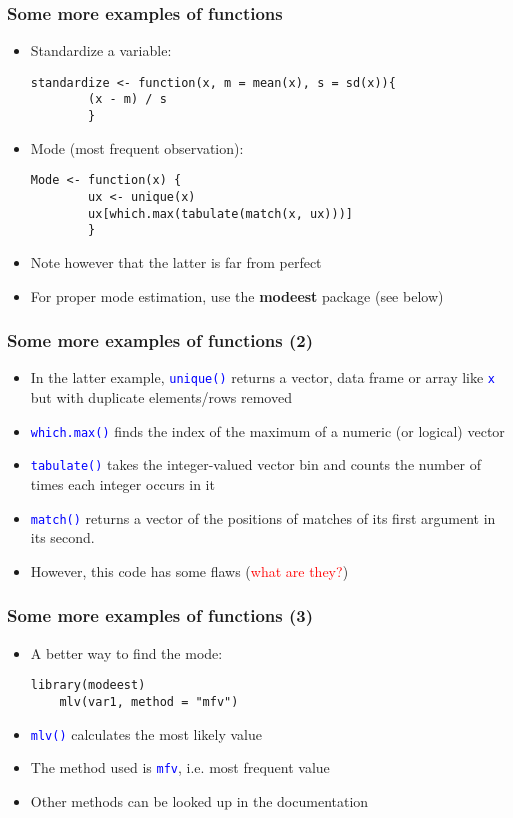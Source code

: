 \documentclass[10pt]{beamer}
\newcommand{\cc}[1]{\texttt{\textcolor{blue}{#1}}}
\theoremstyle{definition}
\begin{document}
\begin{frame}[fragile]
\frametitle{Some more examples of functions}
\begin{itemize}
	\item Standardize a variable:
	\begin{lstlisting}[style = rstyle, breaklines]
	standardize <- function(x, m = mean(x), s = sd(x)){
 		(x - m) / s
		}
	\end{lstlisting}
	\item Mode (most frequent observation):
	\begin{lstlisting}[style = rstyle, breaklines]
	Mode <- function(x) {
		ux <- unique(x)
		ux[which.max(tabulate(match(x, ux)))]
		}
	\end{lstlisting}
	\item Note however that the latter is far from perfect
	\item For proper mode estimation, use the \textbf{modeest} package (see below)
\end{itemize}
\end{frame}

\begin{frame}[fragile]
\frametitle{Some more examples of functions (2)}
\begin{itemize}
	\item In the latter example, \cc{unique()} returns a vector, data frame or array like \cc{x} but with duplicate elements/rows removed
	\item \cc{which.max()} finds the index of the maximum of a numeric (or logical) vector
	\item \cc{tabulate()} takes the integer-valued vector bin and counts the number of times each integer occurs in it
	\item \cc{match()} returns a vector of the positions of matches of its first argument in its second.
	\item However, this code has some flaws (\textcolor{red}{what are they?})
\end{itemize}
\end{frame}

\begin{frame}[fragile]
\frametitle{Some more examples of functions (3)}
\begin{itemize}
	\item A better way to find the mode:
	\begin{lstlisting}[style = rstyle, breaklines]
	library(modeest)
	mlv(var1, method = "mfv")
	\end{lstlisting}
	\item \cc{mlv()} calculates the most likely value
	\item The method used is \cc{mfv}, i.e. most frequent value
	\item Other methods can be looked up in the documentation
\end{itemize}
\end{frame}
\end{document}
